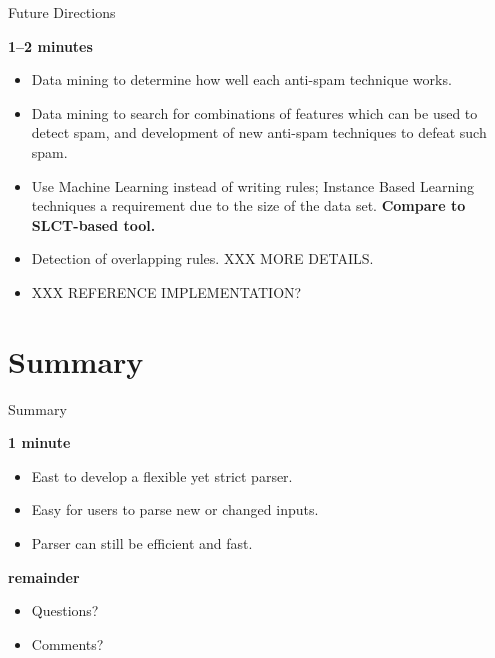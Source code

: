 \documentclass{beamer}
\newcommand{\timingnote}[1]{%
    \textbf{#1}%
}
\begin{document}
\begin{frame}{Future Directions}

    \timingnote{1--2 minutes}

    \begin{itemize}

        \item Data mining to determine how well each anti-spam technique
            works.

        \item Data mining to search for combinations of features which can
            be used to detect spam, and development of new anti-spam
            techniques to defeat such spam.

        \item Use Machine Learning instead of writing rules; Instance Based
            Learning techniques a requirement due to the size of the data
            set.  \timingnote{Compare to SLCT-based tool.}

        \item Detection of overlapping rules.  XXX MORE DETAILS\@.

        \item XXX REFERENCE IMPLEMENTATION\@?

    \end{itemize}

\end{frame}


\section{Summary}

\begin{frame}{Summary}

    \timingnote{1 minute}

    \begin{itemize}

        \item East to develop a flexible yet strict parser.

        \item Easy for users to parse new or changed inputs.

        \item Parser can still be efficient and fast.

    \end{itemize}

    \timingnote{remainder}

    \begin{itemize}

        \item Questions?

        \item Comments?

    \end{itemize}

\end{frame}
\end{document}
